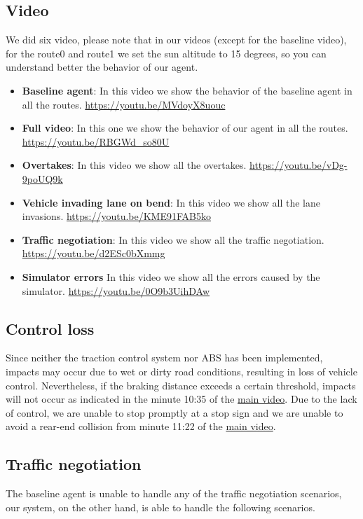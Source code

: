 \documentclass{article}
\begin{document}
\subsection{Video}
We did six video, please note that in our videos (except for the baseline video), for the route0 and route1 we set the sun altitude to 15 degrees,
so you can understand better the behavior of our agent.

\begin{itemize}
    \item \textbf{Baseline agent}: In this video we show the behavior of the baseline agent in all the routes. \url{https://youtu.be/MVdoyX8uouc}
    \item \textbf{Full video}: In this one we show the behavior of our agent in all the routes. \url{https://youtu.be/RBGWd_so80U}
    \item \textbf{Overtakes}: In this video we show all the overtakes. \url{https://youtu.be/vDg-9poUQ9k}
    \item \textbf{Vehicle invading lane on bend}: In this video we show all the lane invasions. \url{https://youtu.be/KME91FAB5ko}
    \item \textbf{Traffic negotiation}: In this video we show all the traffic negotiation. \url{https://youtu.be/d2ESc0bXmmg}
    \item \textbf{Simulator errors} In this video we show all the errors caused by the simulator. \url{https://youtu.be/0O9b3UihDAw}
\end{itemize}

\subsection{Control loss}
Since neither the traction control system nor ABS has been implemented, impacts may occur due to wet or dirty road conditions, 
resulting in loss of vehicle control. Nevertheless, if the braking distance exceeds a certain threshold, impacts will not occur as 
indicated in the minute 10:35 of the \href{https://youtu.be/RBGWd_so80U?t=635}{main video}. Due to the lack of control, we are unable to stop promptly at a stop sign and we are unable to avoid a rear-end collision from minute 11:22 of the \href{https://youtu.be/RBGWd_so80U?t=682}{main video}.

\subsection{Traffic negotiation}
The baseline agent is unable to handle any of the traffic negotiation scenarios, our system, on the other hand, is able to handle the following scenarios.
\end{document}
